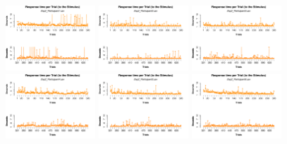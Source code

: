 \begin{figure}[th]
\centering
\includegraphics[width=0.30\textwidth]{Figures/RT1_Exp2_P1} \includegraphics[width=0.30\textwidth]{Figures/RT1_Exp2_P2} \includegraphics[width=0.30\textwidth]{Figures/RT1_Exp2_P3}
\includegraphics[width=0.30\textwidth]{Figures/RT1_Exp2_P4} \includegraphics[width=0.30\textwidth]{Figures/RT1_Exp2_P5} \includegraphics[width=0.30\textwidth]{Figures/RT1_Exp2_P6}

\end{figure}
